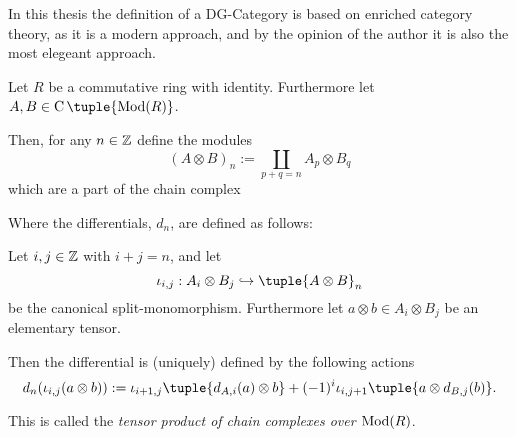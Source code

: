 In this thesis the definition of a DG-Category is based on enriched category theory, as it is a modern approach, and by the opinion of the author it is also the most elegeant approach.

\begin{definition}
    \label{def:tensor_product_of_chain_complexes_over_Mod(R)}
    Let \( R \) be a commutative ring with identity. Furthermore let \( A, B \in \C \tuple{\Mod(R)} \).

    Then, for any  \( n \in {\mathbb{Z}} \) define the modules
    \[
        (A \otimes B)_n := \coprod_{p + q = n} A_p \otimes B_q
    \]
    which are a part of the chain complex
    \begin{center}
    \end{center}

    Where the differentials, \( d_n \), are defined as follows:
    
    Let \( i, j \in {\mathbb{Z}} \) with \( i + j = n \), and let
    \[
        \iota_{i, j}: A_i \otimes B_j \hookrightarrow \tuple{A \otimes B}_n
    \]
    be the canonical split-monomorphism. Furthermore let \( a \otimes b \in A_i \otimes B_j \) be an elementary tensor.

    Then the differential is (uniquely) defined by the following actions
    \[
        d_n(\iota_{i, j}(a \otimes b)) := \iota_{i + 1, j}\tuple{d_{A, i}(a) \otimes b} + (-1)^{i} \iota_{i, j + 1}\tuple{a \otimes d_{B, j}(b)}.
    \]

    This is called the \emph{tensor product of chain complexes over \( \operatorname{Mod}(R) \)}.
\end{definition}

